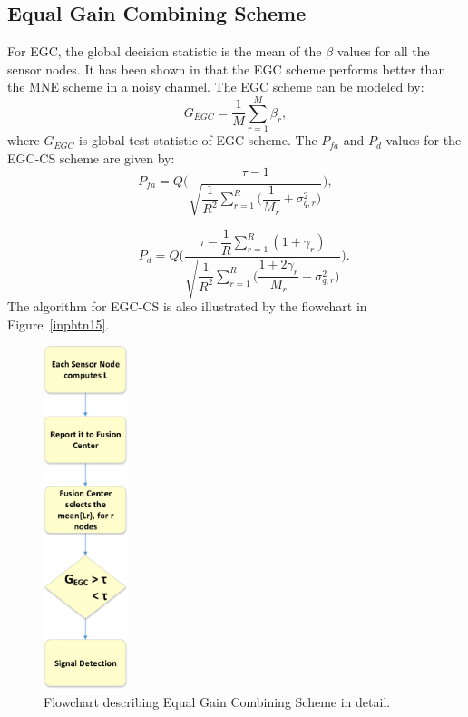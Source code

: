 \subsection{Equal Gain Combining Scheme}

For EGC, the global decision statistic is the mean of the $\beta$ values for all the sensor nodes. It has been shown in \cite{inhtn12} that the EGC scheme performs better than the MNE scheme in a noisy channel. The EGC scheme can be modeled by:
\begin{equation}
	\label{eq:11}
	 G_{EGC} = \dfrac{1}{M}\sum_{r=1}^{M}{\beta_r},
\end{equation}
where $G_{EGC}$ is global test statistic of EGC scheme. The $P_{fa}$ and $P_d$ values for the EGC-CS scheme are given by:
\begin{equation}
\label{eq:12}
P_{fa} = Q\Bigg(\dfrac{\tau-1}{\sqrt{\dfrac{1}{R^2}\sum_{r=1}^{R}\bigg(\dfrac{1}{M_r}+\sigma_{q,r}^2\bigg)}}\Bigg),
\end{equation}

\begin{equation}
\label{eq:13}
~~~~~~P_d = Q\Bigg(\dfrac{\tau-\dfrac{1}{R}\sum_{r=1}^R(1+\gamma_r)}{\sqrt{\dfrac{1}{R^2}\sum_{r=1}^{R}\bigg(\dfrac{1+2\gamma_r}{M_r}+\sigma_{q,r}^2\bigg)}}\Bigg).
\end{equation}
The algorithm for EGC-CS is also illustrated by the flowchart in Figure~\ref{inphtn15}.

\begin{figure}[ht!]
	\centering
	\includegraphics[width=\textwidth,height=10cm,keepaspectratio]{images/Gill/figs/egcscheme.eps}
\caption{Flowchart describing Equal Gain Combining Scheme in detail.} 
\label{egcscheme}      
\end{figure}



